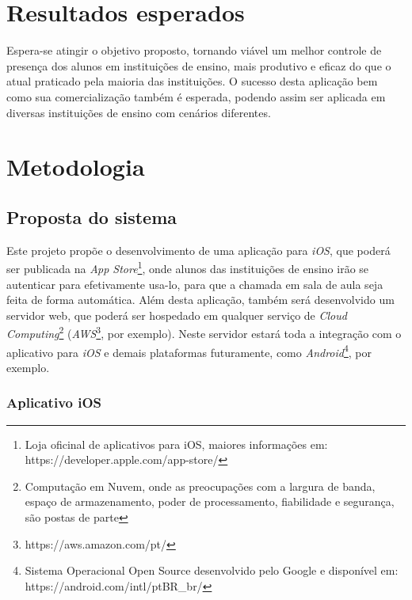 \documentclass[
	12pt,
	oneside,
	a4paper,
	english,
	brazil,
]{abntex2}
\begin{document}

\chapter{Resultados esperados}

Espera-se atingir o objetivo proposto, tornando viável um melhor controle de presença dos alunos em instituições de ensino, mais produtivo e eficaz do que o atual praticado pela maioria das instituições.
O sucesso desta aplicação bem como sua comercialização também é esperada, podendo assim ser aplicada em diversas instituições de ensino com cenários diferentes.



\chapter{Metodologia}
\section{Proposta do sistema}

Este projeto propõe o desenvolvimento de uma aplicação para \emph{iOS}, que poderá ser publicada na \emph{App Store}\footnote{Loja oficinal de aplicativos para iOS, maiores informações em: https://developer.apple.com/app-store/}, onde alunos das instituições de ensino irão se autenticar para efetivamente usa-lo, para que a chamada em sala de aula seja feita de forma automática. Além desta aplicação, também será desenvolvido um servidor web, que poderá ser hospedado em qualquer serviço de \emph{Cloud Computing}\footnote{Computação em Nuvem, onde as preocupações com a largura de banda, espaço de armazenamento, poder de processamento, fiabilidade e segurança, são postas de parte\cite{cloud-computing-about}} (\emph{AWS}\footnote{https://aws.amazon.com/pt/}, por exemplo). Neste servidor estará toda a integração com o aplicativo para \emph{iOS} e demais plataformas futuramente, como \emph{Android}\footnote{Sistema Operacional Open Source desenvolvido pelo Google e disponível em: https://android.com/intl/pt\-BR\_br/}, por exemplo.

\subsection{Aplicativo iOS}
\end{document}

